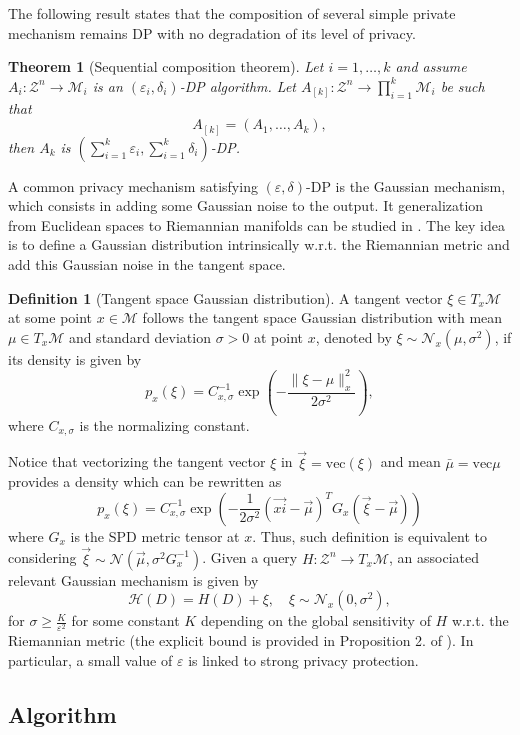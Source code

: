 \documentclass[10pt,a4paper]{book}
\theoremstyle{definition}
\newtheorem{defn}{Definition}[section]
\theoremstyle{plain}
\newtheorem{thm}{Theorem}[section]
\theoremstyle{remark}
\newcommand \M {\mathcal{M}}
\begin{document}
The following result states that the composition of several simple private mechanism remains DP with no degradation of its level of privacy.
\begin{thm}[Sequential composition theorem]
Let $i=1,\dots, k$ and assume $A_i:\mathcal{Z}^{n}\to \M_i$ is an $(\varepsilon_i,\delta_i)$-DP algorithm. Let $A_{[k]}:\mathcal{Z}^{n}\to \prod_{i=1}^{k}\mathcal{M}_i$ be such that
$$A_{[k]}=(A_{1},\dots, A_k),$$
then
$A_{k}$ is $\left(\sum_{i=1}^{k}\varepsilon_i,\sum_{i=1}^{k}\delta_i\right)$-DP.
\end{thm}

A common privacy mechanism satisfying $(\varepsilon,\delta)$-DP is the Gaussian mechanism, which consists in adding some Gaussian noise to the output. It generalization from Euclidean spaces to Riemannian manifolds can be studied in \cite{han2024differentially}. The key idea is to define a Gaussian distribution intrinsically w.r.t. the Riemannian metric and add this Gaussian noise in the tangent space. 
\begin{defn}[Tangent space Gaussian distribution]
A tangent vector $\xi\in T_{x}\M$ at some point $x\in \M$ follows the tangent space Gaussian distribution with mean $\mu\in T_x\M$ and standard deviation $\sigma>0$ at point $x$, denoted by $\xi\sim\mathcal{N}_{x}(\mu,\sigma^2)$, if its density is given by
$$p_x(\xi)=C_{x,\sigma}^{-1}\exp\left(-\frac{\|\xi-\mu\|_{x}^{2}}{2\sigma^2}\right),$$
where $C_{x,\sigma}$ is the normalizing constant.
\end{defn}
Notice that vectorizing the tangent vector $\xi$ in $\vec{\xi}=\text{vec}(\xi)$ and mean $\bar{\mu}=\text{vec}{\mu}$ provides a density which can be rewritten as
$$p_{x}(\xi)=C_{x,\sigma}^{-1}\exp\left(-\frac{1}{2\sigma^2}(\vec{xi}-\vec{\mu})^{T}G_x(\vec{\xi}-\vec{\mu})\right)$$
where $G_x$ is the SPD metric tensor at $x$. Thus, such definition is equivalent to considering $\vec{\xi}\sim\mathcal{N}(\vec{\mu},\sigma^{2}G_x^{-1})$. 
Given a query $H:\mathcal{Z}^{n}\to T_x\M$, an associated relevant Gaussian mechanism is given by
$$\mathcal{H}(D)=H(D)+\xi,\quad \xi \sim\mathcal{N}_x(0,\sigma^2),$$
for $\sigma\ge \frac{K}{\varepsilon^2}$ for some constant $K$ depending on the global sensitivity of $H$ w.r.t. the Riemannian metric (the explicit bound is provided in Proposition 2. of \cite{han2024differentially}). In particular, a small value of $\varepsilon$ is linked to strong privacy protection. 



\subsection{Algorithm}
\end{document}
